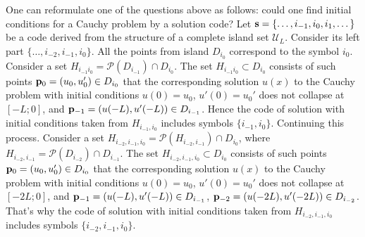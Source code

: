 One can reformulate one of the questions above as follows: could one find initial conditions for a Cauchy problem by a solution code?
Let $\vb{s} = \{ \dots, i_{-1}, i_0, i_1, \dots \}$ be a code derived from the structure of a complete island set $\mathscr{U}_L$.
Consider its left part $\{ \dots, i_{-2}, i_{-1}, i_0 \}$.
All the points from island $D_{i_0}$ correspond to the symbol $i_0$.
Consider a set $H_{i_{-1} i_0} = \mathcal{P}(D_{i_{-1}}) \cap D_{i_0}$.
The set $H_{i_{-1} i_0} \subset D_{i_0}$ consists of such points $\vb{p}_0 = (u_0, u_0') \in D_{i_0}$ that the corresponding solution $u(x)$ to the Cauchy problem with initial conditions $u(0) = u_0$, $u'(0) = u_0'$ does not collapse at $[-L; 0]$, and $\vb{p}_{-1} = (u(-L), u'(-L)) \in D_{i_{-1}}$.
Hence the code of solution with initial conditions taken from $H_{i_{-1}, i_0}$ includes symbols $\{ i_{-1}, i_0 \}$.
Continuing this process.
Consider a set $H_{i_{-2}, i_{-1}, i_0} = \mathcal{P}(H_{i_{-2}, i_{-1}}) \cap D_{i_0}$, where $H_{i_{-2}, i_{-1}} = \mathcal{P}(D_{i_{-2}}) \cap D_{i_{-1}}$.
The set $H_{i_{-2}, i_{-1}, i_0} \subset D_{i_0}$ consists of such points $\vb{p}_0 = (u_0, u_0') \in D_{i_0}$ that the corresponding solution $u(x)$ to the Cauchy problem with initial conditions $u(0) = u_0$, $u'(0) = u_0'$ does not collapse at $[-2L; 0]$, and $\vb{p}_{-1} = (u(-L), u'(-L)) \in D_{i_{-1}}$, $\vb{p}_{-2} = (u(-2L), u'(-2L)) \in D_{i_{-2}}$.
That's why the code of solution with initial conditions taken from $H_{i_{-2}, i_{-1}, i_0}$ includes symbols $\{ i_{-2}, i_{-1}, i_0 \}$.

